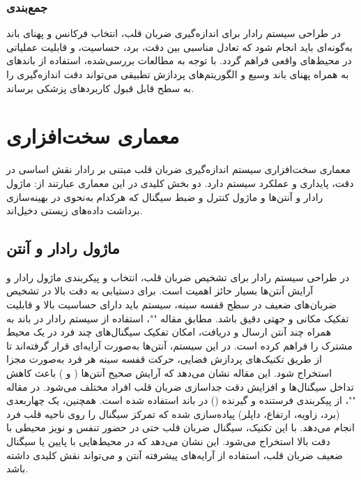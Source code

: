 \subsubsection*{جمع‌بندی} %
\label{sec:summary-freq-bandwidth}

در طراحی سیستم رادار  برای اندازه‌گیری ضربان قلب، انتخاب فرکانس و پهنای باند به‌گونه‌ای باید انجام شود که تعادل مناسبی بین دقت، برد، حساسیت، و قابلیت عملیاتی در محیط‌های واقعی فراهم گردد. با توجه به مطالعات بررسی‌شده، استفاده از باندهای  به همراه پهنای باند وسیع و الگوریتم‌های پردازش تطبیقی می‌تواند دقت اندازه‌گیری را به سطح قابل قبول کاربردهای پزشکی برساند.


\section{معماری سخت‌افزاری} %
\label{sec:hardware-architecture}

معماری سخت‌افزاری سیستم اندازه‌گیری ضربان قلب مبتنی بر رادار  نقش اساسی در دقت، پایداری و عملکرد سیستم دارد. دو بخش کلیدی در این معماری عبارتند از: ماژول رادار و آنتن‌ها و ماژول کنترل و ضبط سیگنال که هرکدام به‌نحوی در بهینه‌سازی برداشت داده‌های زیستی دخیل‌اند.

\subsection{ماژول رادار و آنتن} %
\label{sec:radar-module-antenna}

در طراحی سیستم رادار  برای تشخیص ضربان قلب، انتخاب و پیکربندی ماژول رادار و آرایش آنتن‌ها بسیار حائز اهمیت است. برای دستیابی به دقت بالا در تشخیص ضربان‌های ضعیف در سطح قفسه سینه، سیستم باید دارای حساسیت بالا و قابلیت تفکیک مکانی و جهتی دقیق باشد.
مطابق مقاله ""، استفاده از سیستم رادار  در باند  به همراه چند آنتن ارسال و دریافت، امکان تفکیک سیگنال‌های چند فرد در یک محیط مشترک را فراهم کرده است. در این سیستم، آنتن‌ها به‌صورت آرایه‌ای قرار گرفته‌اند تا از طریق تکنیک‌های پردازش فضایی، حرکت قفسه سینه هر فرد به‌صورت مجزا استخراج شود. این مقاله نشان می‌دهد که آرایش صحیح آنتن‌ها ( و ) باعث کاهش تداخل سیگنال‌ها و افزایش دقت جداسازی ضربان قلب افراد مختلف می‌شود.
در مقاله ""، از پیکربندی  فرستنده و  گیرنده () در باند  استفاده شده است. همچنین، یک  چهاربعدی (برد، زاویه، ارتفاع، داپلر) پیاده‌سازی شده که تمرکز سیگنال را روی ناحیه قلب فرد انجام می‌دهد. با این تکنیک، سیگنال ضربان قلب حتی در حضور تنفس و نویز محیطی با دقت بالا استخراج می‌شود. این نشان می‌دهد که در محیط‌هایی با  پایین یا سیگنال ضعیف ضربان قلب، استفاده از آرایه‌های پیشرفته آنتن و  می‌تواند نقش کلیدی داشته باشد.

